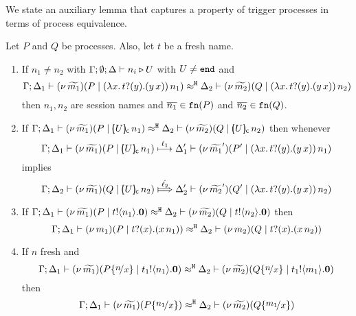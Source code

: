 
We state an auxiliary lemma that captures a property of trigger
processes in terms of process equivalence.
\begin{lemma}
	\label{lem:trigger_application}
	Let $P$ and $Q$ be processes. Also, let $t$ be a fresh name.
	\begin{enumerate}
		\item
			If $n_1 \not= n_2$ with $\Gamma; \emptyset; \Delta \vdash n_i \triangleright U$ with $U \not= \mathtt{end}$
			and
			\[
				\Gamma; \Delta_1 \vdash (\nu\, \widetilde{m_1})(P \;|\; (\lambda x.\,t ? (y) . (y\, {x}))\, {n_1} ) \approx^\mathtt{H} \Delta_2 \vdash (\nu\, \widetilde{m_2})(Q \;|\; (\lambda x.\,t ? (y) . (y\, {x}))\, {n_2} )
			\]
			then $n_1, n_2$ are session names and $\overline{n_1} \in \mathtt{fn}(P)$ and $\overline{n_2} \in \mathtt{fn}(Q)$.

		\item
			If
			$
				\horel{\Gamma}{\Delta_1}{\newsp{\widetilde{m_1}}{P \Par  \appl{\omapchar{U}}{n_1} }}%
				{\hwb}
				{\Delta_2}{\newsp{\widetilde{m_2}}{Q \Par \appl{\omapchar{U}}{n_2} }} %
			$
			then whenever
			\[
				\horel{\Gamma}{\Delta_1}{\newsp{\widetilde{m_1}}{P \Par \appl{\omapchar{U}}{n_1} }} %
				{\hby{\ell_1}}
				{\Delta_1'}{\newsp{\widetilde{m_1}'}{P' \Par \appl{(\trvalx{t})}{n_1} }}
			\]
			implies
			\[
				\horel{\Gamma}{\Delta_2}{\newsp{\widetilde{m_1}}{Q \Par \appl{\omapchar{U}}{n_2} }} %
				{\Hby{\hat{\ell_2}}}
				{\Delta_2'}{\newsp{\widetilde{m_2}'}{Q' \Par \appl{(\trvalx{t})}{n_2} }} %
			\]
		\item
			If
			$
				\Gamma; \Delta_1 \vdash  (\nu\, \widetilde{m_1})(P \;|\; t ! \langle n_1 \rangle . \mathbf{0})  \approx^\mathtt{H} \Delta_2 \vdash  (\nu\, \widetilde{m_2})(Q \;|\; t ! \langle n_2 \rangle . \mathbf{0})
			$
			then
			\[
				\Gamma; \Delta_1 \vdash  (\nu\, m_1)(P \;|\; t ? (x) .{(x\, {n_1})})  \approx^\mathtt{H} \Delta_2 \vdash  (\nu\, m_2)(Q \;|\; t ? (x) .{(x\, {n_2})})
			\]

		\item
			If $n$ fresh and
			\[
				\horel{\Gamma}{\Delta_1}{ \newsp{\widetilde{m_1}}{P \subst{n}{x} \Par \bout{t_1}{n_1} \inact }}
				{\hwb}
				{\Delta_2}{ \newsp{\widetilde{m_2}}{Q \subst{n}{x} \Par \bout{t_1}{m_1} \inact }}
			\]
			then
			\[
				\horel{\Gamma}{\Delta_1}{ \newsp{\widetilde{m_1}}{P \subst{n_1}{x} }}
				{\hwb}
				{\Delta_2}{ \newsp{\widetilde{m_2}}{Q \subst{m_1}{x} }}
			\]


\end{enumerate}
\end{lemma}
